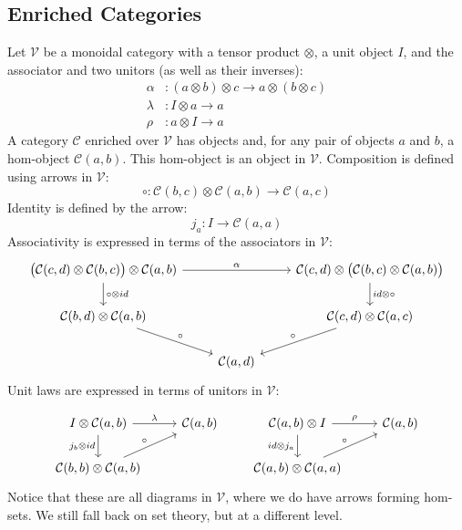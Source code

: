 \documentclass[DaoFP]{subfiles}
\begin{document}
\subsection{Enriched Categories}

Let $\mathcal V$ be a monoidal category with a tensor product $\otimes$, a unit object $I$, and the associator and two unitors (as well as their inverses):
\begin{align*}
\alpha &\colon (a \otimes b) \otimes c \to a \otimes (b \otimes c)
\\
 \lambda &\colon I \otimes a \to a
 \\
 \rho &\colon a \otimes I \to a
\end{align*}
A category $\mathcal C$ enriched over $\mathcal V$ has objects and, for any pair of objects $a$ and $b$, a hom-object $\mathcal C(a, b)$. This hom-object is an object in $\mathcal V$. Composition is defined using arrows in $\mathcal V$:
\[ \circ \colon \mathcal C (b, c) \otimes \mathcal C (a, b) \to \mathcal C (a, c) \]
Identity is defined by the arrow:
\[ j_a \colon I \to \mathcal C (a, a) \]
Associativity is expressed in terms of the associators in $\mathcal V$:
\[
 \begin{tikzcd}
 \big( \mathcal C (c, d) \otimes \mathcal C (b, c) \big) \otimes \mathcal C(a, b)
 \arrow[rr, "\alpha"]
 \arrow[d, "\circ \otimes id"]
 &&  \mathcal C (c, d) \otimes \big( \mathcal C (b, c) \otimes \mathcal C(a, b) \big) 
 \arrow[d, "id \otimes \circ"]
 \\
 \mathcal C(b, d) \otimes \mathcal C(a, b)
 \arrow[dr, "\circ"]
 && \mathcal C(c, d) \otimes \mathcal C(a, c)
 \arrow[dl, "\circ"']
 \\
 & \mathcal C(a, d)
 \end{tikzcd}
\]
Unit laws are expressed in terms of unitors in $\mathcal V$:

\[
 \begin{tikzcd}
 I \otimes \mathcal C(a, b)
 \arrow[r, "\lambda"]
 \arrow[d, "j_b \otimes id"']
 & \mathcal C(a, b)
 \\
 \mathcal C(b, b) \otimes \mathcal C(a, b)
 \arrow[ru, "\circ"]
 \end{tikzcd}
 \qquad
\begin{tikzcd}
\mathcal C(a, b) \otimes I
\arrow[r, "\rho"]
\arrow[d, "id \otimes j_a"']
& \mathcal C(a, b)
\\
\mathcal C(a, b) \otimes \mathcal C(a, a)
\arrow[ru, "\circ"]
 \end{tikzcd}
\]
Notice that these are all diagrams in $\mathcal V$, where we do have arrows forming hom-sets. We still fall back on set theory, but at a different level.
\end{document}
